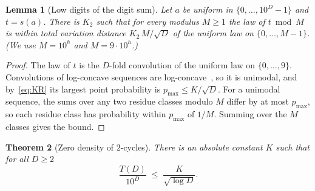 \documentclass[11pt]{article}
\newtheorem{theorem}{Theorem}[section]
\newtheorem{lemma}[theorem]{Lemma}
\theoremstyle{definition}
\theoremstyle{remark}
\begin{document}
\begin{lemma}[Low digits of the digit sum]\label{lem:lowdigits}
Let $a$ be uniform in $\{0,\dots,10^D-1\}$ and $t=s(a)$. There is $K_2$ such
that for every modulus $M\ge1$ the law of $t\bmod M$ is within total
variation distance $K_2\,M/\sqrt D$ of the uniform law on
$\{0,\dots,M-1\}$. (We use $M=10^h$ and $M=9\cdot10^h$.)
\end{lemma}

\begin{proof}
The law of $t$ is the $D$-fold convolution of the uniform law on
$\{0,\dots,9\}$. Convolutions of log-concave sequences are
log-concave~\cite{Hoggar}, so it is unimodal, and by~\eqref{eq:KR} its largest
point probability is $p_{\max}\le K/\sqrt D$. For a unimodal sequence, the
sums over any two residue classes modulo $M$ differ by at most $p_{\max}$, so
each residue class has probability within $p_{\max}$ of $1/M$. Summing over
the $M$ classes gives the bound.
\end{proof}

\begin{theorem}[Zero density of $2$-cycles]\label{thm:zero}
There is an absolute constant $K$ such that for all $D\ge2$
\[
  \frac{T(D)}{10^D}\;\le\;\frac{K}{\sqrt{\log D}} .
\]
\end{theorem}
\end{document}
